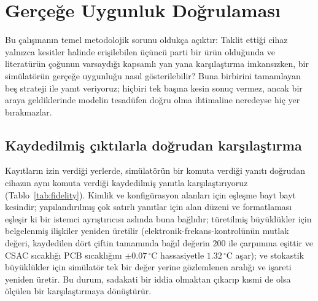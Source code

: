 \documentclass[conference]{IEEEtran}
\begin{document}
\section{Gerçeğe Uygunluk Doğrulaması}
\label{sec:validation}
Bu çalışmanın temel metodolojik sorunu oldukça açıktır: Taklit ettiği cihaz yalnızca kesitler halinde erişilebilen üçüncü parti bir ürün olduğunda ve literatürün çoğunun varsaydığı kapsamlı yan yana karşılaştırma imkansızken, bir simülatörün gerçeğe uygunluğu nasıl gösterilebilir? Buna birbirini tamamlayan beş strateji ile yanıt veriyoruz; hiçbiri tek başına kesin sonuç vermez, ancak bir araya geldiklerinde modelin tesadüfen doğru olma ihtimaline neredeyse hiç yer bırakmazlar.

\subsection{Kaydedilmiş çıktılarla doğrudan karşılaştırma}
Kayıtların izin verdiği yerlerde, simülatörün bir komuta verdiği yanıtı doğrudan cihazın aynı komuta verdiği kaydedilmiş yanıtla karşılaştırıyoruz (Tablo~\ref{tab:fidelity}). Kimlik ve konfigürasyon alanları için eşleşme bayt bayt kesindir; yapılandırılmış çok satırlı yanıtlar için alan düzeni ve formatlaması eşleşir ki bir istemci ayrıştırıcısı aslında buna bağlıdır; türetilmiş büyüklükler için belgelenmiş ilişkiler yeniden üretilir (elektronik-frekans-kontrolünün mutlak değeri, kaydedilen dört çiftin tamamında bağıl değerin $200$ ile çarpımına eşittir ve CSAC sıcaklığı PCB sıcaklığını $\pm0.07\,^\circ$C hassasiyetle $1.32\,^\circ$C aşar); ve stokastik büyüklükler için simülatör tek bir değer yerine gözlemlenen aralığı ve işareti yeniden üretir. Bu durum, sadakati bir iddia olmaktan çıkarıp kısmi de olsa ölçülen bir karşılaştırmaya dönüştürür.
\end{document}

